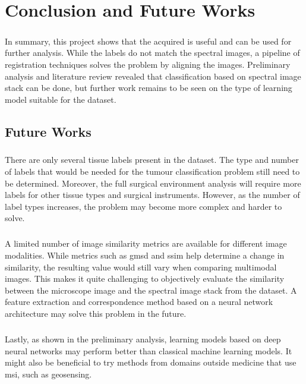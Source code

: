 \documentclass[12pt,oneside]{report}
\begin{document}
\chapter{Conclusion and Future Works}

\paragraph{}
In summary, this project shows that the acquired is useful and can be used for further analysis. While the labels do not match the spectral images, a pipeline of registration techniques solves the problem by aligning the images. Preliminary analysis and literature review revealed that classification based on spectral image stack can be done, but further work remains to be seen on the type of learning model suitable for the dataset.

\section{Future Works}
\paragraph{}
There are only several tissue labels present in the dataset. The type and number of labels that would be needed for the tumour classification problem still need to be determined. Moreover, the full surgical environment analysis will require more labels for other tissue types and surgical instruments. However, as the number of label types increases, the problem may become more complex and harder to solve.

\paragraph{}
A limited number of image similarity metrics are available for different image modalities. While metrics such as \acrshort{gmsd} and \acrshort{ssim} help determine a change in similarity, the resulting value would still vary when comparing multimodal images. This makes it quite challenging to objectively evaluate the similarity between the microscope image and the spectral image stack from the dataset. A feature extraction and correspondence method based on a neural network architecture may solve this problem in the future.

\paragraph{}
Lastly, as shown in the preliminary analysis, learning models based on deep neural networks may perform better than classical machine learning models. It might also be beneficial to try methods from domains outside medicine that use \acrshort{msi}, such as geosensing.
\end{document}
